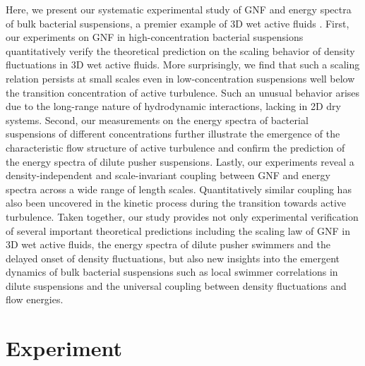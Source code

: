 \documentclass[twocolumn,aps,prx,amsmath,amssymb,longbibliography,superscriptaddress]{revtex4-2}
\begin{document}
Here, we present our systematic experimental study of GNF and energy spectra of bulk bacterial suspensions, a premier example of 3D wet active fluids \cite{Marchetti2013}. First, our experiments on GNF in high-concentration bacterial suspensions quantitatively verify the theoretical prediction on the scaling behavior of density fluctuations in 3D wet active fluids. More surprisingly, we find that such a scaling relation persists at small scales even in low-concentration suspensions well below the transition concentration of active turbulence. Such an unusual behavior arises due to the long-range nature of hydrodynamic interactions, lacking in 2D dry systems. Second, our measurements on the energy spectra of bacterial suspensions of different concentrations further illustrate the emergence of the characteristic flow structure of active turbulence and confirm the prediction of the energy spectra of dilute pusher suspensions. Lastly, our experiments reveal a density-independent and scale-invariant coupling between GNF and energy spectra across a wide range of length scales. Quantitatively similar coupling has also been uncovered in the kinetic process during the transition towards active turbulence. Taken together, our study provides not only experimental verification of several important theoretical predictions including the scaling law of GNF in 3D wet active fluids, the energy spectra of dilute pusher swimmers and the delayed onset of density fluctuations, but also new insights into the emergent dynamics of bulk bacterial suspensions such as local swimmer correlations in dilute suspensions and the universal coupling between density fluctuations and flow energies.

\section{Experiment}
\end{document}
